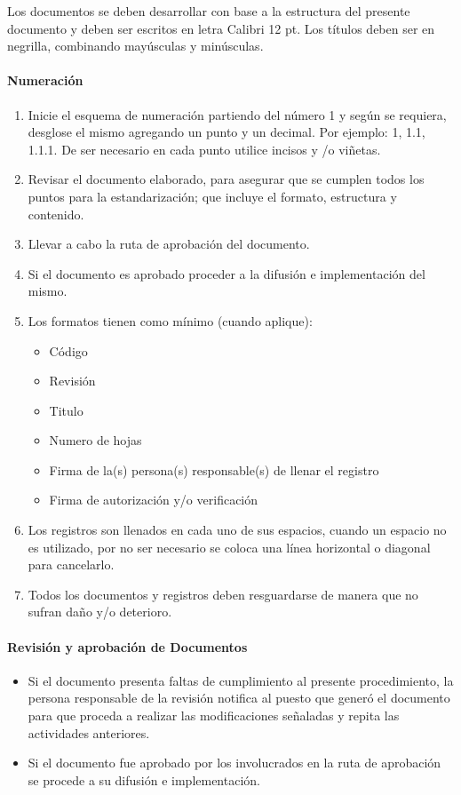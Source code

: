 Los documentos se deben desarrollar con base a la estructura del presente documento y deben ser escritos en letra Calibri 12 pt. Los títulos deben ser en negrilla, combinando mayúsculas y minúsculas.

\paragraph{Numeración}

\begin{enumerate}
	\item Inicie el esquema de numeración partiendo del número 1 y según se requiera, desglose el mismo agregando un punto y un decimal. Por ejemplo: 1, 1.1, 1.1.1. De ser necesario en cada punto utilice incisos y /o viñetas.
	\item Revisar el documento elaborado, para asegurar que se cumplen todos los puntos para la estandarización; que incluye el formato, estructura y contenido.
	\item Llevar a cabo la ruta de aprobación del documento.
	\item Si el documento es aprobado proceder a la difusión e implementación del mismo. 
	\item Los formatos tienen como mínimo (cuando aplique):
	\begin{itemize}
		\item Código
		\item Revisión
		\item Titulo
		\item Numero de hojas
		\item Firma de la(s) persona(s) responsable(s) de llenar el registro
		\item Firma de autorización y/o verificación
	\end{itemize}
	\item Los registros son llenados en cada uno de sus espacios, cuando un espacio no es utilizado, por no ser necesario se coloca una línea horizontal o diagonal para cancelarlo.
	\item Todos los documentos y registros deben resguardarse de manera que no sufran daño y/o deterioro.
\end{enumerate}

\paragraph{Revisión y aprobación de Documentos}

\begin{itemize}
	\item Si el documento presenta faltas de cumplimiento al presente procedimiento, la persona responsable de la revisión notifica al puesto que generó el documento para que proceda a realizar las modificaciones señaladas y repita las actividades anteriores.
	\item Si el documento fue aprobado por los involucrados en la ruta de aprobación se procede a su difusión e implementación.
\end{itemize}

